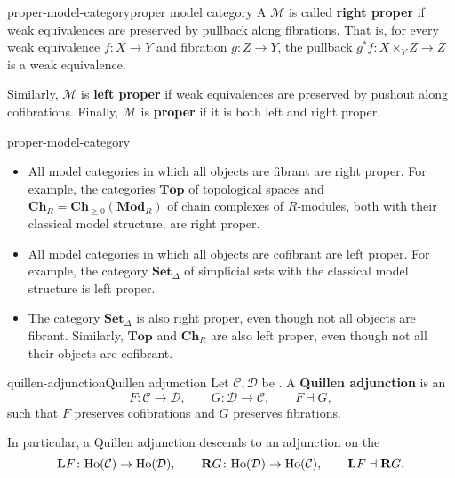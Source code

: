 \begin{topic}{proper-model-category}{proper model category}
    A  $\mathcal{M}$ is called \textbf{right proper} if weak equivalences are preserved by pullback along fibrations. That is, for every weak equivalence $f \colon X \to Y$ and fibration $g \colon Z \to Y$, the pullback $g^* f \colon X \times_Y Z \to Z$ is a weak equivalence.
    
    Similarly, $\mathcal{M}$ is \textbf{left proper} if weak equivalences are preserved by pushout along cofibrations.
    Finally, $\mathcal{M}$ is \textbf{proper} if it is both left and right proper.
\end{topic}

\begin{example}{proper-model-category}
    \begin{itemize}
        \item All model categories in which all objects are fibrant are right proper. For example, the categories $\textbf{Top}$ of topological spaces and $\textbf{Ch}_R = \textbf{Ch}_{\ge 0}(\textbf{Mod}_R)$ of chain complexes of $R$-modules, both with their classical model structure, are right proper.
        \item All model categories in which all objects are cofibrant are left proper. For example, the category $\textbf{Set}_\Delta$ of simplicial sets with the classical model structure is left proper. 
        \item The category $\textbf{Set}_\Delta$ is also right proper, even though not all objects are fibrant. Similarly, $\textbf{Top}$ and $\textbf{Ch}_R$ are also left proper, even though not all their objects are cofibrant.
    \end{itemize}
\end{example}

\begin{topic}{quillen-adjunction}{Quillen adjunction}
    Let $\mathcal{C}, \mathcal{D}$ be . A \textbf{Quillen adjunction} is an 
    \[ F \colon \mathcal{C} \to \mathcal{D}, \qquad G \colon \mathcal{D} \to \mathcal{C}, \qquad F \dashv G , \]
    such that $F$ preserves cofibrations and $G$ preserves fibrations.
    
    In particular, a Quillen adjunction descends to an adjunction on the 
    \[ \textbf{L} F \colon \textup{Ho}(\mathcal{C}) \to \textup{Ho}(\mathcal{D}), \qquad \textbf{R} G \colon \textup{Ho}(\mathcal{D}) \to \textup{Ho}(\mathcal{C}), \qquad \textbf{L} F \dashv \textbf{R} G . \]
\end{topic}

